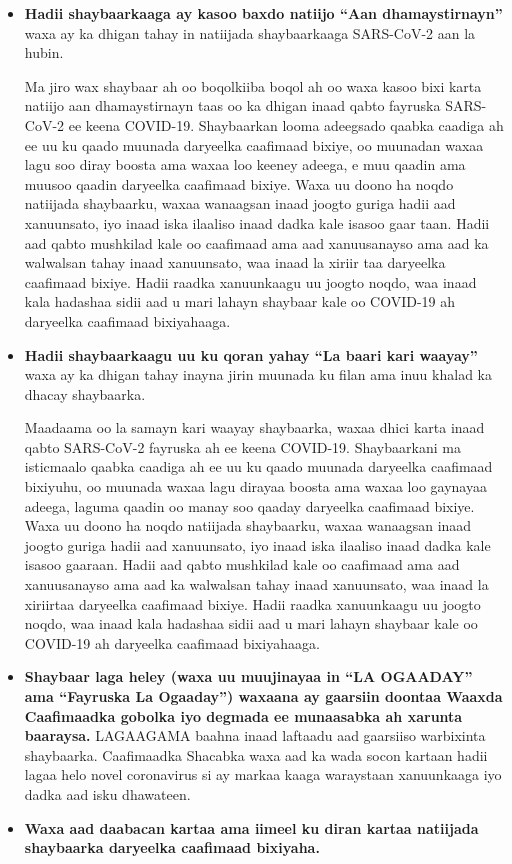 \documentclass[10pt]{article}
\begin{document}
\begin{itemize}
\item

  \textbf{Hadii shaybaarkaaga ay kasoo baxdo natiijo ``Aan dhamaystirnayn''}
  waxa ay ka dhigan tahay in natiijada shaybaarkaaga SARS-CoV-2 aan la hubin.

  Ma jiro wax shaybaar ah oo boqolkiiba boqol ah oo waxa kasoo bixi karta
  natiijo aan dhamaystirnayn taas oo ka dhigan inaad qabto fayruska SARS-CoV-2
  ee keena COVID-19.  Shaybaarkan looma adeegsado qaabka caadiga ah ee uu ku
  qaado muunada daryeelka caafimaad bixiye, oo muunadan waxaa lagu soo diray
  boosta ama waxaa loo keeney adeega, e muu qaadin ama muusoo qaadin daryeelka
  caafimaad bixiye.  Waxa uu doono ha noqdo natiijada shaybaarku, waxaa
  wanaagsan inaad joogto guriga hadii aad xanuunsato, iyo inaad iska ilaaliso
  inaad dadka kale isasoo gaar taan. Hadii aad qabto mushkilad kale oo caafimaad
  ama aad xanuusanayso ama aad ka walwalsan tahay inaad xanuunsato, waa inaad la
  xiriir taa daryeelka caafimaad bixiye.  Hadii raadka xanuunkaagu uu joogto
  noqdo, waa inaad kala hadashaa sidii aad u mari lahayn shaybaar kale oo
  COVID-19 ah daryeelka caafimaad bixiyahaaga.

\item

  \textbf{Hadii shaybaarkaagu uu ku qoran yahay ``La baari kari waayay''} waxa
  ay ka dhigan tahay inayna jirin muunada ku filan ama inuu khalad ka dhacay
  shaybaarka.

  Maadaama oo la samayn kari waayay shaybaarka, waxaa dhici karta inaad qabto
  SARS-CoV-2 fayruska ah ee keena COVID-19.  Shaybaarkani ma isticmaalo qaabka
  caadiga ah ee uu ku qaado muunada daryeelka caafimaad bixiyuhu, oo muunada
  waxaa lagu dirayaa boosta ama waxaa loo gaynayaa adeega, laguma qaadin oo
  manay soo qaaday daryeelka caafimaad bixiye. Waxa uu doono ha noqdo natiijada
  shaybaarku, waxaa wanaagsan inaad joogto guriga hadii aad xanuunsato, iyo
  inaad iska ilaaliso inaad dadka kale isasoo gaaraan. Hadii aad qabto mushkilad
  kale oo caafimaad ama aad xanuusanayso ama aad ka walwalsan tahay inaad
  xanuunsato, waa inaad la xiriirtaa daryeelka caafimaad bixiye.  Hadii raadka
  xanuunkaagu uu joogto noqdo, waa inaad kala hadashaa sidii aad u mari lahayn
  shaybaar kale oo COVID-19 ah daryeelka caafimaad bixiyahaaga.

\item

  \textbf{Shaybaar laga heley (waxa uu muujinayaa in ``LA OGAADAY'' ama
  ``Fayruska La Ogaaday'') waxaana ay gaarsiin doontaa Waaxda Caafimaadka
  gobolka iyo degmada ee munaasabka ah xarunta baaraysa.} LAGAAGAMA baahna inaad
  laftaadu aad gaarsiiso warbixinta shaybaarka. Caafimaadka Shacabka waxa aad ka
  wada socon kartaan hadii lagaa helo novel coronavirus si ay markaa kaaga
  waraystaan xanuunkaaga iyo dadka aad isku dhawateen.

\item

  \textbf{Waxa aad daabacan kartaa ama iimeel ku diran kartaa natiijada
  shaybaarka daryeelka caafimaad bixiyaha.}

\end{itemize}
\end{document}
